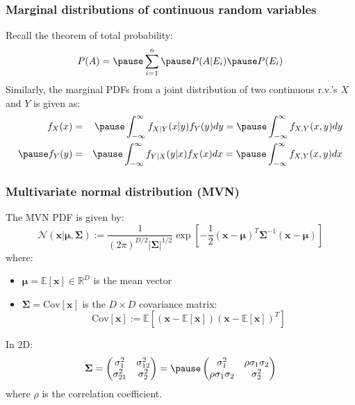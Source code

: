 \documentclass[usenames,dvipsnames,smaller%
]{beamer}
\newcommand{\lt}{\left}
\newcommand{\rt}{\right}
\newcommand{\?}{\stackrel{?}{=}}
\newcommand{\fr}{\frac}
\begin{document}
\begin{frame}
  \frametitle{Marginal distributions of continuous random variables} \pause
  Recall the theorem of total probability:\pause
  \begin{equation}
    \label{eq:12}
    P(A) = \pause \sum_{i=1}^n \pause P(A|E_i) \pause P(E_i)
  \end{equation}
  \pause
  Similarly, the marginal PDFs from a joint distribution of two continuous r.v.'s $X$ and $Y$ is given as:\pause
  \begin{eqnarray}
    f_X(x) &=& \pause \int_{-\infty}^\infty f_{X|Y}(x|y)f_Y(y)dy =\pause \int_{-\infty}^\infty f_{X,Y}(x,y)dy \\ \pause
    f_Y(y) &=&\pause \int_{-\infty}^\infty f_{Y|X}(y|x)f_X(x)dx =\pause  \int_{-\infty}^\infty f_{X,Y}(x,y)dx
  \end{eqnarray}
\end{frame}






 \begin{frame}
   \frametitle{Multivariate normal distribution (MVN)}
   \pause
   The MVN PDF is given by:\pause
   \begin{equation}
     \mathscr{N}(\bm{x} | \bm{\mu}, \bm{\Sigma}) :=
     \fr{1}{(2\pi)^{D/2}|\bm{\Sigma}|^{1/2}} \exp \lt[ -\fr{1}{2} ({\bm x} - {\bm\mu})^T{\bm\Sigma}^{-1}({\bm x} - {\bm \mu})\rt]
     \end{equation}
     \pause
     where:
     \begin{itemize}
     \item $\bm\mu = \mathbb{E}[{\bm x}] \in \mathbb{R}^D$ is the mean vector \pause
     \item $\bm\Sigma = \mathrm{Cov}[{\bm x}]$ is the $D\times D$ covariance matrix: \pause
       \begin{equation}
         \mathrm{Cov}[{\bm x}] := \mathbb{E}\lt[ (\bm x - \mathbb{E}[{\bm x}])(\bm x - \mathbb{E}[{\bm x}])^T\rt]
       \end{equation}
     \end{itemize}
     \pause
     In 2D:
     \pause
     \begin{equation}
       \bm{\Sigma} =
       \begin{pmatrix}
         \sigma_1^2 & \sigma_{12}^2 \\ \sigma_{21}^2 & \sigma_{2}^2
       \end{pmatrix}
       = \pause
       \begin{pmatrix}
         \sigma_1^2 & \rho\sigma_{1}\sigma_2 \\ \rho\sigma_{1}\sigma_2 & \sigma_{2}^2
       \end{pmatrix}
     \end{equation}
     \pause
     where $\rho$ is the correlation coefficient.
 \end{frame}
\end{document}
